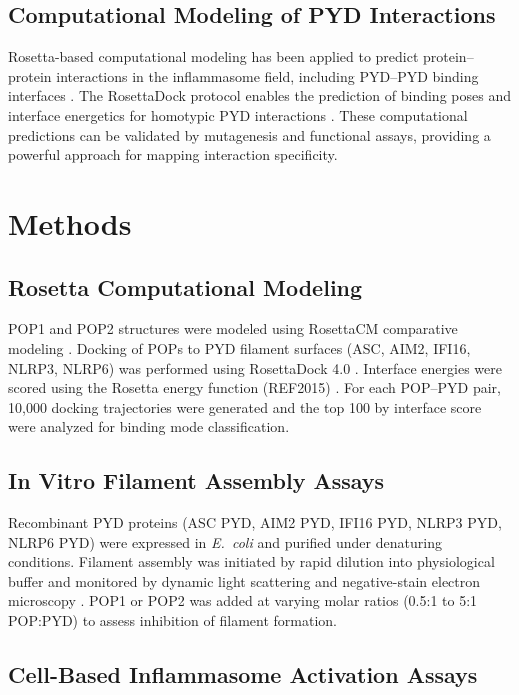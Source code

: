 \documentclass[11pt]{article}
\begin{document}
\subsection{Computational Modeling of PYD Interactions}

Rosetta-based computational modeling has been applied to predict protein--protein interactions in the inflammasome field, including PYD--PYD binding interfaces \citep{de2012,sborgi2015}. The RosettaDock protocol enables the prediction of binding poses and interface energetics for homotypic PYD interactions \citep{gray2003,chaudhury2011}. These computational predictions can be validated by mutagenesis and functional assays, providing a powerful approach for mapping interaction specificity.

\section{Methods}

\subsection{Rosetta Computational Modeling}

POP1 and POP2 structures were modeled using RosettaCM comparative modeling \citep{song2013}. Docking of POPs to PYD filament surfaces (ASC, AIM2, IFI16, NLRP3, NLRP6) was performed using RosettaDock 4.0 \citep{gray2003,chaudhury2011}. Interface energies were scored using the Rosetta energy function (REF2015) \citep{alford2017}. For each POP--PYD pair, 10,000 docking trajectories were generated and the top 100 by interface score were analyzed for binding mode classification.

\subsection{In Vitro Filament Assembly Assays}

Recombinant PYD proteins (ASC PYD, AIM2 PYD, IFI16 PYD, NLRP3 PYD, NLRP6 PYD) were expressed in \textit{E.~coli} and purified under denaturing conditions. Filament assembly was initiated by rapid dilution into physiological buffer and monitored by dynamic light scattering and negative-stain electron microscopy \citep{lu2014}. POP1 or POP2 was added at varying molar ratios (0.5:1 to 5:1 POP:PYD) to assess inhibition of filament formation.

\subsection{Cell-Based Inflammasome Activation Assays}
\end{document}
